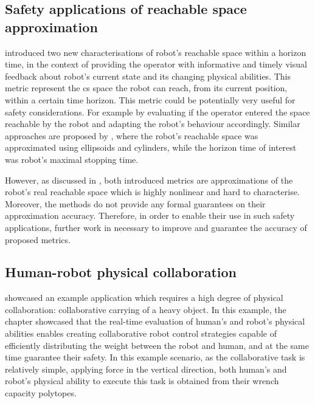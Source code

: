 \subsection{Safety applications of reachable space approximation}

 introduced two new characterisations of robot's reachable space within a horizon time, in the context of providing the operator with informative and timely visual feedback about robot's current state and its changing physical abilities. This metric represent the \gls{cs} space the robot can reach, from its current position, within a certain time horizon. This metric could be potentially very useful for safety considerations. For example by evaluating if the operator entered the space reachable by the robot and adapting the robot's behaviour accordingly. Similar approaches are proposed by \citet{pereira2017,schepp2022}, where the robot's reachable space was approximated using ellipsoids and cylinders, while the horizon time of interest was robot's maximal stopping time. 

However, as discussed in , both introduced metrics are approximations of the robot's real reachable space which is highly nonlinear and hard to characterise. Moreover, the methods do not provide any formal guarantees on their approximation accuracy. Therefore, in order to enable their use in such safety applications, further work in necessary to improve and guarantee the accuracy of proposed metrics.  


\subsection{Human-robot physical collaboration}

 showcased an example application which requires a high degree of physical collaboration: collaborative carrying of a heavy object. In this example, the chapter showcased that the real-time evaluation of human's and robot's physical abilities enables creating collaborative robot control strategies capable of efficiently distributing the weight between the robot and human, and at the same time guarantee their safety. In this example scenario, as the collaborative task is relatively simple, applying force in the vertical direction, both human's and robot's physical ability to execute this task is obtained from their wrench capacity polytopes. 

